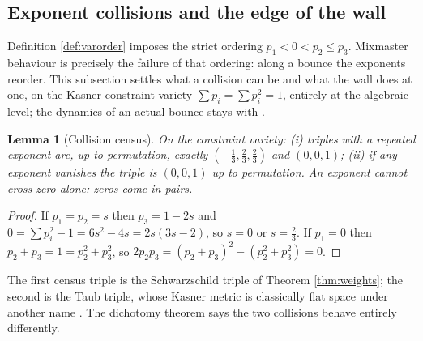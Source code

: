 \documentclass[11pt]{article}
\newtheorem{lemma}[theorem]{Lemma}
\theoremstyle{definition}
\begin{document}
\subsection{Exponent collisions and the edge of the wall}\label{subsec:collisions}

Definition \ref{def:varorder} imposes the strict ordering $p_1 < 0 < p_2 \leq p_3$. Mixmaster behaviour is precisely the failure of that ordering: along a bounce the exponents reorder. This subsection settles what a collision can be and what the wall does at one, on the Kasner constraint variety $\sum p_i = \sum p_i^2 = 1$, entirely at the algebraic level; the dynamics of an actual bounce stays with \cite{ButlerT6}.

\begin{lemma}[Collision census]\label{lem:census}
On the constraint variety: (i) triples with a repeated exponent are, up to permutation, exactly $(-\tfrac13, \tfrac23, \tfrac23)$ and $(0,0,1)$; (ii) if any exponent vanishes the triple is $(0,0,1)$ up to permutation. An exponent cannot cross zero alone: zeros come in pairs.
\end{lemma}

\begin{proof}
If $p_1 = p_2 = s$ then $p_3 = 1-2s$ and $0 = \sum p_i^2 - 1 = 6s^2 - 4s = 2s(3s-2)$, so $s = 0$ or $s = \tfrac23$. If $p_1 = 0$ then $p_2 + p_3 = 1 = p_2^2 + p_3^2$, so $2p_2p_3 = (p_2+p_3)^2 - (p_2^2+p_3^2) = 0$.
\end{proof}

The first census triple is the Schwarzschild triple of Theorem \ref{thm:weights}; the second is the Taub triple, whose Kasner metric is classically flat space under another name \cite{Kasner1921}. The dichotomy theorem says the two collisions behave entirely differently.
\end{document}
